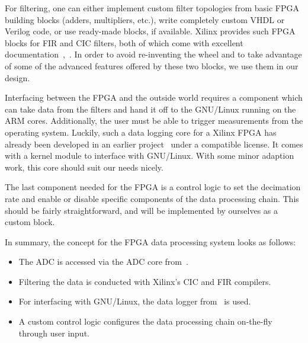For filtering,  one can either  implement custom filter topologies  from basic
FPGA building blocks (adders, multipliers, etc.), write completely custom VHDL
or Verilog code, or use ready-made blocks, if available.  Xilinx provides such
FPGA  blocks for  FIR  and CIC  filters,  both of  which  come with  excellent
documentation~\cite{xilinx:cic-compiler},~\cite{xilinx:fir-compiler}.       In
order to  avoid re-inventing the  wheel and to take  advantage of some  of the
advanced features offered by these two blocks, we use them in our design.

Interfacing  between the  FPGA  and  the outside  world  requires a  component
which  can take  data  from the  filters  and  hand it  off  to the  GNU/Linux
running  on the  ARM cores. Additionally,  the user  must be  able to  trigger
measurements  from  the  operating  system.   Luckily,  such  a  data  logging
core  for   a  Xilinx  FPGA   has  already   been  developed  in   an  earlier
project~\cite{pita:github:huesser:zynq-logger} under a compatible license.  It
comes  with a  kernel  module  to interface  with  GNU/Linux. With some  minor
adaption work, this core should suit our needs nicely.

The  last  component needed  for  the  FPGA is  a  control  logic to  set  the
decimation  rate  and  enable  or  disable specific  components  of  the  data
processing  chain. This  should  be   fairly  straightforward,  and   will  be
implemented by ourselves as a custom block.

In summary, the concept for the FPGA data processing system looks as follows:
\begin{itemize}\tightlist
    \item
        The      ADC      is      accessed     via      the      ADC      core
        from~\cite{pita:github:pitaya-notes}.
    \item
        Filtering the data is conducted with Xilinx's CIC and FIR compilers.
    \item
        For     interfacing     with     GNU/Linux,    the     data     logger
        from~\cite{huess-schnid} is used.
    \item
        A custom control logic configures the data processing chain on-the-fly
        through user input.
\end{itemize}

%
%
